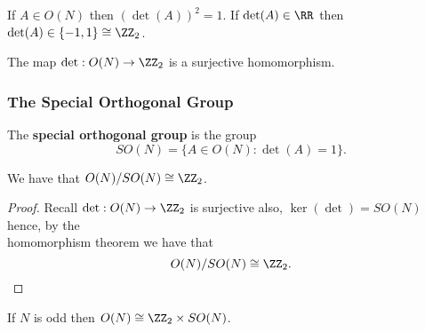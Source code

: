 \documentclass[12pt, a4paper]{article}
\begin{document}
\begin{proposition}
    If \(A \in O(N)\) then \((\det(A))^2 =1\). If \(\det(A) \in \RR\) then \(\det(A) \in \{-1,1\} \cong \ZZ_2\).
\end{proposition}

\begin{mdthm}
    The map \(\det : O(N) \to \ZZ_2\) is a surjective homomorphism.
\end{mdthm}

\subsubsection{The Special Orthogonal Group}

\begin{definition}
    The \textbf{special orthogonal group} is the group 
    \[SO(N) = \{A \in O(N) : \det(A) =1\}.\]
\end{definition}

\begin{mdthm}
    We have that \(O(N) / SO(N) \cong \ZZ_2\).
\end{mdthm}

\begin{proof}
    Recall \(\det:O(N) \to \ZZ_2\) is surjective also, \(\ker(\det)=SO(N)\) hence, by the \\ homomorphism theorem we have that 
    \[O(N) / SO(N) \cong \ZZ_2.\]
\end{proof}

\begin{mdthm}
    If \(N\) is odd then \(O(N) \cong \ZZ_2 \times SO(N)\).
\end{mdthm}
\end{document}
